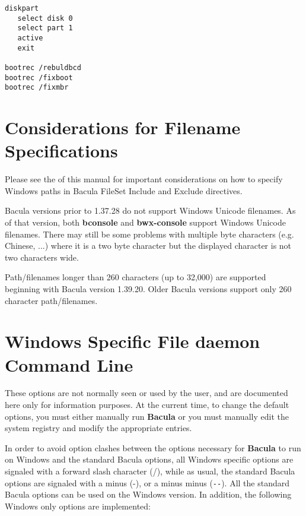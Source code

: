 \begin{verbatim}
diskpart
   select disk 0
   select part 1
   active
   exit

bootrec /rebuldbcd
bootrec /fixboot
bootrec /fixmbr
\end{verbatim}


\section{Considerations for Filename Specifications}

Please see the 
 of this manual
for important considerations on how to specify Windows paths in Bacula FileSet
Include and Exclude directives. 

Bacula versions prior to 1.37.28 do not support Windows Unicode filenames.
As of that version, both {\bf bconsole} and {\bf bwx-console} support Windows
Unicode filenames. There may still be some problems with multiple byte
characters (e.g. Chinese, ...) where it is a two byte character but the
displayed character is not two characters wide.

Path/filenames longer than 260 characters (up to 32,000) are supported
beginning with Bacula version 1.39.20. Older Bacula versions support
only 260 character path/filenames.

\section{Windows Specific File daemon Command Line}

These options are not normally seen or used by the user, and are documented
here only for information purposes. At the current time, to change the default
options, you must either manually run {\bf Bacula} or you must manually edit
the system registry and modify the appropriate entries. 

In order to avoid option clashes between the options necessary for {\bf
Bacula} to run on Windows and the standard Bacula options, all Windows
specific options are signaled with a forward slash character (/), while as
usual, the standard Bacula options are signaled with a minus (-), or a minus
minus (\verb:--:). All the standard Bacula options can be used on the Windows
version. In addition, the following Windows only options are implemented: 

